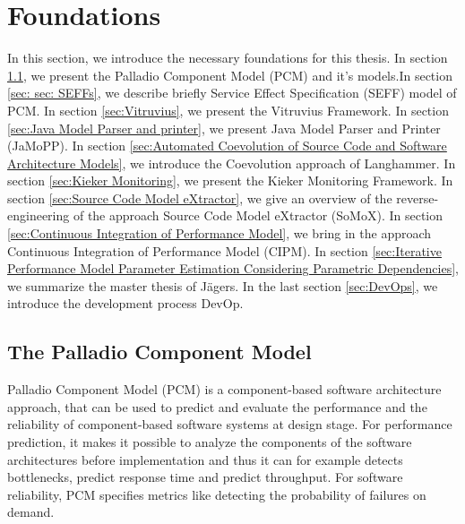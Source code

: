 

\chapter{Foundations}
\label{ch:Foundations}
In this section, we introduce the necessary foundations for this thesis. In section \ref{sec:The Palladio Component Model}, we present the Palladio Component Model (PCM) and it's models.In section \ref{sec: sec: SEFFs}, we describe briefly Service Effect Specification (SEFF) model of PCM. In section \ref{sec:Vitruvius}, we present the Vitruvius Framework. In section \ref{sec:Java Model Parser and printer}, we present Java Model Parser and Printer (JaMoPP). In section \ref{sec:Automated Coevolution of Source Code and Software Architecture Models}, we introduce the Coevolution approach of Langhammer. In section \ref{sec:Kieker Monitoring}, we present the Kieker Monitoring Framework. In section \ref{sec:Source Code Model eXtractor}, we give an overview of the reverse-engineering of the approach Source Code Model eXtractor (SoMoX). In section \ref{sec:Continuous Integration of Performance Model}, we bring in the approach Continuous Integration of Performance Model (CIPM). In section \ref{sec:Iterative Performance Model Parameter Estimation Considering Parametric Dependencies}, we summarize the master thesis of Jägers. In the last section \ref{sec:DevOps}, we introduce the development process DevOp.    

\section{The Palladio Component Model}
\label{sec:The Palladio Component Model}
Palladio Component Model (PCM) is a component-based software architecture approach, that can be used to predict and evaluate the performance and the reliability of component-based software systems at design stage. For performance prediction, it makes it possible to analyze the components of the software architectures before implementation and thus it can for example detects bottlenecks, predict response time and predict throughput. For software reliability, PCM specifies metrics like detecting the probability of failures on demand. 


